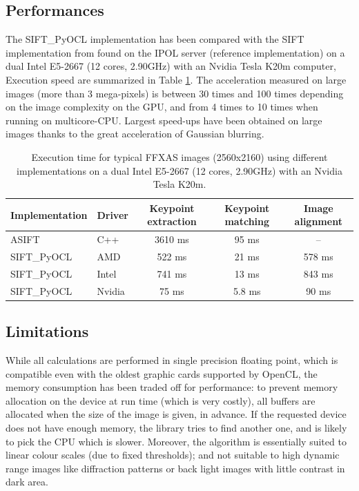 \documentclass[preprint]{iucr}
\begin{document}
\subsection{Performances}

The SIFT\_PyOCL implementation has been compared with the SIFT
implementation from \cite{ASIFT} found on the IPOL server (reference
implementation) on a dual Intel E5-2667 (12 cores, 2.90GHz) with an Nvidia Tesla
K20m computer, Execution speed are summarized in Table \ref{bench}.
The acceleration measured on large images (more than 3 mega-pixels) is between
30 times and 100 times depending on the image complexity on the GPU, and from 4
times to 10 times when running on multicore-CPU.
Largest speed-ups have been obtained on large images thanks to the
great acceleration of Gaussian blurring.

\begin{table}
\caption{Execution time for typical FFXAS images (2560x2160) using different
implementations on a dual Intel E5-2667 (12 cores, 2.90GHz) with an Nvidia Tesla
K20m.}
\label{bench}
\vspace{1mm}
\begin{center}
\begin{tabular}{l l ccc}
Implementation & Driver & Keypoint extraction & Keypoint matching &
Image alignment\\
\hline
ASIFT        &   C++     &   3610 ms  & 95 ms  & --  \\
SIFT\_PyOCL  &   AMD  &   522 ms  &  21 ms&  578 ms \\
SIFT\_PyOCL  &   Intel  &   741 ms  &  13 ms&  843 ms\\
SIFT\_PyOCL  &   Nvidia  &    75 ms  &  5.8 ms & 90 ms\\
\end{tabular}
\end{center}
\end{table}



\subsection{Limitations}
While all calculations are performed in single precision floating point,
which is compatible even with the oldest graphic cards supported by OpenCL, the
memory consumption has been traded off for performance: to prevent memory
allocation on the device at run time (which is very costly), all buffers are
allocated when the size of the image is given, in advance. If the
requested device does not have enough memory, the library tries to find another
one, and is likely to pick the CPU which is slower.
Moreover, the algorithm is essentially suited
to linear colour scales (due to fixed thresholds); and not suitable to high
dynamic range images like diffraction patterns or back light images with little
contrast in dark area.
\end{document}
